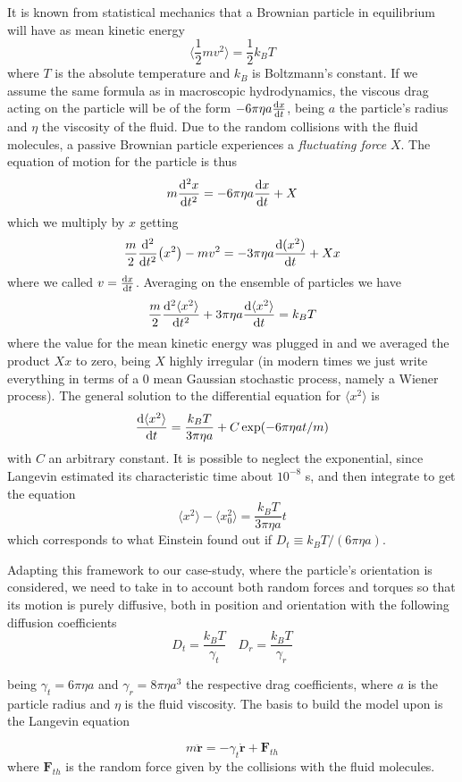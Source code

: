 \documentclass[../../master_thesis_np.tex]{subfiles}
\begin{document}
	It is known from statistical mechanics that a Brownian particle in equilibrium will have as mean kinetic energy
	\[ \langle \frac{1}{2}mv^2 \rangle =  \frac{1}{2} k_B T\]
	where $T$ is the absolute temperature and $k_B$ is Boltzmann's constant. If we assume the same formula as in macroscopic hydrodynamics, the viscous drag acting on the particle will be of the form $-6 \pi \eta a \dv{x}{t}$, being $a$ the particle's radius and $\eta$ the viscosity of the fluid. Due to the random collisions with the fluid molecules, a passive Brownian particle experiences a \emph{fluctuating force} $X$. The equation of motion for the particle is thus
	\[ m \dv[2]{x}{t} = -6 \pi \eta a \dv{x}{t} + X \]
	which we multiply by $x$ getting
	\[ \frac{m}{2} \dv[2]{t}(x^2) - mv^2  = -3 \pi \eta a \dv{(x^2)}{t} + Xx \]
	where we called $v = \dv{x}{t}$. Averaging on the ensemble of particles we have
	\[ \frac{m}{2} \dv[2]{\langle x^2 \rangle}{t}  + 3 \pi \eta a \dv{\langle x^2 \rangle}{t} = k_B T \]
	where the value for the mean kinetic energy was plugged in and we averaged the product $Xx$ to zero, being $X$ highly irregular (in modern times we just write everything in terms of a 0 mean Gaussian stochastic process, namely a Wiener process). The general solution to the differential equation for $\langle x^2 \rangle$ is 
	\[ \dv{\langle x^2 \rangle}{t} = \frac{k_B T}{3 \pi \eta a} + C \exp(-6 \pi \eta a t / m)\]
	with $C$ an arbitrary constant. It is possible to neglect the exponential, since Langevin estimated its characteristic time about $10^{-8}$ s, and then integrate to get the equation
	\[ \langle x^2 \rangle - \langle x_0^2 \rangle = \frac{k_B T}{3 \pi \eta a}t\]
	which corresponds to what Einstein found out if $D_t \equiv k_B T/(6 \pi \eta a)$.
	
    Adapting this framework to our case-study, where the particle's orientation is considered, we need to take in to account both random forces and torques so that its motion is purely diffusive, both in position and orientation with the following diffusion coefficients
	\begin{equation}
		D_t = \frac{k_B T}{\gamma_t} \quad D_r = \frac{k_B T}{\gamma_r} 
	\end{equation}
	
	being $\gamma_t = 6 \pi \eta a$ and $\gamma_r = 8 \pi \eta a^3$  the respective drag coefficients, where $a$ is the particle radius and $\eta$ is the fluid viscosity. The basis to build the model upon is the Langevin equation
	
	\begin{equation} \label{eq:lang1}
		m \mathbf{\ddot{r}} = -\gamma_t \mathbf{\dot{r}} + \mathbf{F}_{th}
	\end{equation} 
	where $\mathbf{F}_{th}$ is the random force given by the collisions with the fluid molecules.
	
\end{document}
